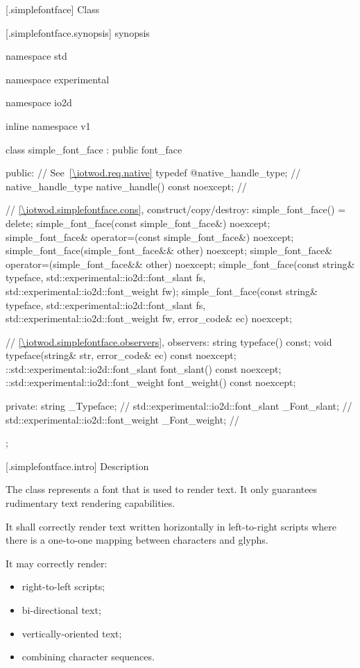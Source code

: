  [\iotwod.simplefontface] {Class }

 [\iotwod.simplefontface.synopsis] { synopsis}

\begin{codeblock}
namespace std { namespace experimental { namespace io2d { inline namespace v1 {
  class simple_font_face : public font_face {
  public:
    // See~\ref{\iotwod.req.native}
    typedef @\impdef@ native_handle_type; // \expos
    native_handle_type native_handle() const noexcept; // \expos
    
    // \ref{\iotwod.simplefontface.cons}, construct/copy/destroy:
    simple_font_face() = delete;
    simple_font_face(const simple_font_face&) noexcept;
    simple_font_face& operator=(const simple_font_face&) noexcept;
    simple_font_face(simple_font_face&& other) noexcept;
    simple_font_face& operator=(simple_font_face&& other) noexcept;
    simple_font_face(const string& typeface,
      std::experimental::io2d::font_slant fs,
      std::experimental::io2d::font_weight fw);
    simple_font_face(const string& typeface,
      std::experimental::io2d::font_slant fs,
      std::experimental::io2d::font_weight fw, error_code& ec) noexcept;

    // \ref{\iotwod.simplefontface.observers}, observers:
    string typeface() const;
    void typeface(string& str, error_code& ec) const noexcept;
    ::std::experimental::io2d::font_slant font_slant() const noexcept;
    ::std::experimental::io2d::font_weight font_weight() const noexcept;

  private:
    string _Typeface;                                    // \expos
    std::experimental::io2d::font_slant _Font_slant;   // \expos
    std::experimental::io2d::font_weight _Font_weight; // \expos
  };
} } } }
\end{codeblock}

 [\iotwod.simplefontface.intro] { Description}

\pnum
{}
The  class represents a font that is used to render text. It only guarantees rudimentary text rendering capabilities.

\pnum
It shall correctly render text written horizontally in left-to-right scripts where there is a one-to-one mapping between characters and glyphs.

\pnum
It may correctly render:
\begin{itemize}
	\item right-to-left scripts;
	\item bi-directional text;
	\item vertically-oriented text;
	\item combining character sequences.
\end{itemize}

